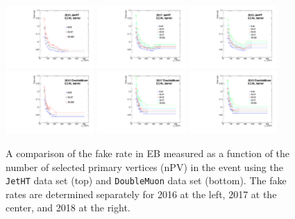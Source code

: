 \begin{figure}[!htbp]
\centering
\includegraphics[width=0.3\textwidth]{fig/compare_pv_EB_2016_jetht.pdf}
\includegraphics[width=0.3\textwidth]{fig/compare_pv_EB_2017_jetht.pdf}
\includegraphics[width=0.3\textwidth]{fig/compare_pv_EB_2018_jetht.pdf}\\
\includegraphics[width=0.3\textwidth]{fig/compare_pv_EB_2016_doublemuon.pdf}
\includegraphics[width=0.3\textwidth]{fig/compare_pv_EB_2017_doublemuon.pdf}
\includegraphics[width=0.3\textwidth]{fig/compare_pv_EB_2018_doublemuon.pdf}
\caption{A comparison of the fake rate in EB measured as a function of the number of selected primary vertices (nPV) in the event using the \texttt{JetHT} data set (top) and \texttt{DoubleMuon} data set (bottom). The fake rates are determined separately for 2016 at the left, 2017 at the center, and 2018 at the right.}
\label{fig:frpileup_EB}
\end{figure}


